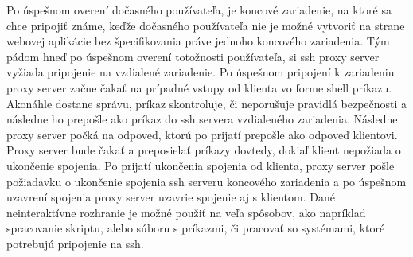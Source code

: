 Po úspešnom overení dočasného používateľa, je koncové zariadenie, na ktoré sa chce pripojiť známe, keďže dočasného používateľa
nie je možné vytvoriť na strane webovej aplikácie bez špecifikovania práve jednoho koncového zariadenia.
Tým pádom hneď po úspešnom overení totožnosti používateľa, si ssh proxy server vyžiada pripojenie na vzdialené zariadenie.
Po úspešnom pripojení k zariadeniu proxy server začne čakať na prípadné vstupy od klienta vo forme shell príkazu.
Akonáhle dostane správu, príkaz skontroluje, či neporušuje pravidlá bezpečnosti a následne ho prepošle ako príkaz do ssh
servera vzdialeného zariadenia.
Následne proxy server počká na odpoveď, ktorú po prijatí prepošle ako odpoveď klientovi.
Proxy server bude čakať a preposielať príkazy dovtedy, dokiaľ klient nepožiada o ukončenie spojenia.
Po prijatí ukončenia spojenia od klienta, proxy server pošle požiadavku o ukončenie spojenia ssh serveru koncového zariadenia
a po úspešnom uzavrení spojenia proxy server uzavrie spojenie aj s klientom.
Dané neinteraktívne rozhranie je možné použiť na veľa spôsobov, ako napríklad spracovanie skriptu, alebo súboru s príkazmi,
či pracovať so systémami, ktoré potrebujú pripojenie na ssh.
